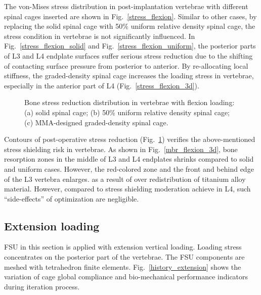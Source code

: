 \documentclass[12pt]{extbook}
\begin{document}
The von-Mises stress distribution in post-implantation vertebrae with different spinal cages inserted are shown in Fig.~\ref{stress_flexion}. Similar to other cases, by replacing the solid spinal cage with 50\% uniform relative density spinal cage, the stress condition in vertebrae is not significantly influenced. In Fig.~\ref{stress_flexion_solid} and Fig.~\ref{stress_flexion_uniform}, the posterior parts of L3 and L4 endplate surfaces suffer serious stress reduction due to the shifting of contacting surface pressure from posterior to anterior. By re-allocating local stiffness, the graded-density spinal cage increases the loading stress in vertebrae, especially in the anterior part of L4 (Fig.~\ref{stress_flexion_3d}).\\

\begin{figure}[htbp]
\centering
{}
\caption{Bone stress reduction distribution in vertebrae with flexion loading: (a) solid spinal cage; (b) 50\% uniform relative density spinal cage; (c) MMA-designed graded-density spinal cage.}
\label{mbr_flexion}
\end{figure}

Contours of post-operative stress reduction (Fig.~\ref{mbr_flexion}) verifies the above-mentioned stress shielding risk in vertebrae. As shown in Fig.~\ref{mbr_flexion_3d}, bone resorption zones in the middle of L3 and L4 endplates shrinks compared to solid and uniform cases. However, the red-colored zone and the front and behind edge of the L3 vertebra enlarges. as a result of over redistribution of titanium alloy material. However, compared to stress shielding moderation achieve in L4, such ``side-effects'' of optimization are negligible.\\


\subsection{Extension loading}

FSU in this section is applied with extension vertical loading. Loading stress concentrates on the posterior part of the vertebrae. The FSU components are meshed with tetrahedron finite elements. Fig.~\ref{history_extension} shows the variation of cage global compliance and bio-mechanical performance indicators during iteration process.\\
\end{document}
